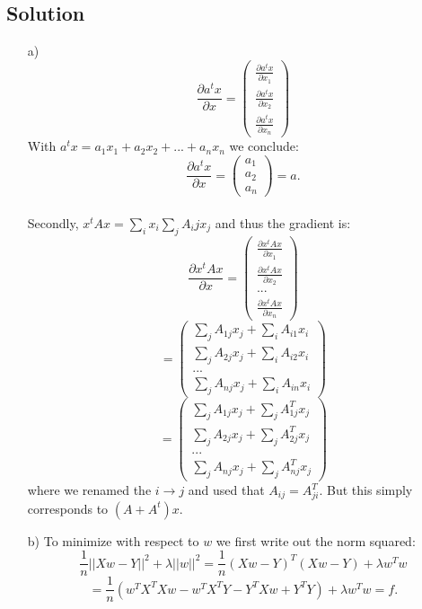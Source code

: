 \documentclass[10pt]{article}
\numberwithin{equation}{section}
\begin{document}
\subsection*{Solution}
\begin{enumerate}
\item[a)]{
$$
\frac{\partial a^tx}{\partial x} = \begin{pmatrix} 
\frac{\partial a^tx}{\partial x_1} \\
\frac{\partial a^tx}{\partial x_2}\\
\frac{\partial a^tx}{\partial x_n}\end{pmatrix}
$$
With $a^tx = a_1 x_1 + a_2 x_2 + ... + a_n x_n$ we conclude:
$$
\frac{\partial a^tx}{\partial x} = \begin{pmatrix} 
a_1 \\
a_2 \\
a_n\end{pmatrix} = a.
$$\\
Secondly, $x^tAx = \sum_{i} x_i \sum_{j} A_ij x_j$ and thus the gradient is:
$$
\frac{\partial x^t Ax}{\partial x} = \begin{pmatrix} 
\frac{\partial x^tAx}{\partial x_1} \\
\frac{\partial x^tAx}{\partial x_2}\\
...\\
\frac{\partial x^tAx}{\partial x_n}\end{pmatrix}
$$
$$
=\begin{pmatrix} 
\sum_{j}A_{1j} x_j + \sum_{i}A_{i1} x_i \\
\sum_{j}A_{2j} x_j + \sum_{i}A_{i2} x_i\\
...\\
\sum_{j}A_{nj} x_j + \sum_{i}A_{in} x_i\end{pmatrix}
$$
$$
=\begin{pmatrix} 
\sum_{j}A_{1j} x_j + \sum_{j}A^T_{1j} x_j \\
\sum_{j}A_{2j} x_j + \sum_{j}A^T_{2j} x_j\\
...\\
\sum_{j}A_{nj} x_j + \sum_{j}A^T_{nj} x_j
\end{pmatrix}
$$
where we renamed the $i\to j$ and used that $A_{ij} = A^T_{ji}$. 
But this simply corresponds to $(A+A^t)x$. }
\item[b)]{
To minimize with respect to $w$ we first write out the norm squared:
$$
\frac{1}{n} ||Xw -Y||^2 + \lambda ||w||^2 = 
\frac{1}{n} (Xw -Y)^T(Xw -Y) + \lambda w^T w
$$
$$
=\frac{1}{n}( w^TX^TXw - w^TX^TY - Y^TXw + Y^TY) + \lambda w^T w = f.
$$}
\end{enumerate}
\end{document}
